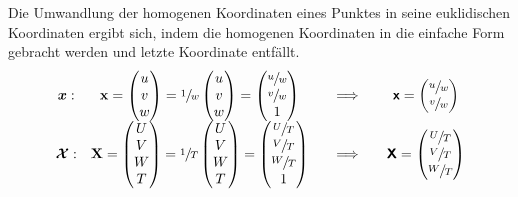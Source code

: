 Die Umwandlung der homogenen Koordinaten eines Punktes in seine euklidischen Koordinaten ergibt sich, indem die homogenen Koordinaten in die einfache Form gebracht werden und letzte Koordinate entfällt.
\begin{equation}\label{eq:einfache_form}
	\begin{array}{c c c c}
		\boldsymbol{x}: & \boldsymbol{\mathrm{x}} = \begin{pmatrix}u\\v\\w\\\end{pmatrix} = \sfrac{1}{w}\begin{pmatrix}u\\v\\w\\\end{pmatrix} = \begin{pmatrix}\sfrac{u}{w}\\\sfrac{v}{w}\\1\\\end{pmatrix} & \quad\Longrightarrow\quad & \boldsymbol{\mathsf{x}} = \begin{pmatrix}\sfrac{u}{w}\\\sfrac{v}{w}\\\end{pmatrix}\\
		\boldsymbol{\mathcal{X}}: & \boldsymbol{\mathrm{X}} = \begin{pmatrix}U\\V\\W\\T\\\end{pmatrix} = \sfrac{1}{T}\begin{pmatrix}U\\V\\W\\T\\\end{pmatrix} = \begin{pmatrix}\sfrac{U}{T}\\\sfrac{V}{T}\\\sfrac{W}{T}\\1\\\end{pmatrix} & \quad\Longrightarrow\quad & \boldsymbol{\mathsf{X}} = \begin{pmatrix}\sfrac{U}{T}\\\sfrac{V}{T}\\\sfrac{W}{T}\\\end{pmatrix}\\
	\end{array}
\end{equation}\mittelgrosserabstand

